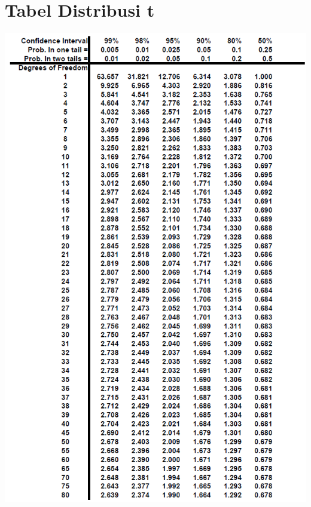 
\chapter*{Tabel Distribusi t}
\vspace{-1cm}
\begin{center}
\includegraphics[width=1\textwidth]{pics/tdist-1.png}
\end{center}
\clearpage


